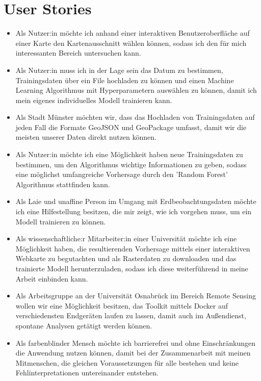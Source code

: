 \documentclass[a4paper,12pt]{article}
\begin{document}
\section{User Stories}
\begin{itemize}
\item Als Nutzer:in möchte ich anhand einer interaktiven Benutzeroberfläche auf einer Karte den Kartenausschnitt wählen können, sodass ich den für mich interessanten Bereich untersuchen kann.
\item Als Nutzer:in muss ich in der Lage sein das Datum zu bestimmen, Trainingsdaten über ein File hochladen zu können und einen Machine Learning Algorithmus mit Hyperparametern auswählen zu können, damit ich mein eigenes individuelles Modell trainieren kann.
\item Als Stadt Münster möchten wir, dass das Hochladen von Trainingsdaten auf jeden Fall die Formate GeoJSON und GeoPackage umfasst, damit wir die meisten unserer Daten direkt nutzen können. 
\item Als Nutzer:in möchte ich eine Möglichkeit haben neue Trainingsdaten zu bestimmen, um den Algorithmus wichtige Informationen zu geben, sodass eine möglichst umfangreiche Vorhersage durch den 'Random Forest' Algorithmus stattfinden kann.
\item Als Laie und unaffine Person im Umgang mit Erdbeobachtungsdaten möchte ich eine Hilfestellung besitzen, die mir zeigt, wie ich vorgehen muss, um ein Modell trainieren zu können.
\item Als wissenschaftliche:r Mitarbeiter:in einer Universität möchte ich eine Möglichkeit haben, die resultierenden Vorhersage  mittels einer interaktiven Webkarte zu begutachten und als Rasterdaten zu downloaden und das trainierte Modell herunterzuladen, sodass ich diese weiterführend in meine Arbeit einbinden kann.
\item Als Arbeitsgruppe an der Universität Osnabrück im Bereich Remote Sensing wollen wir eine Möglichkeit besitzen, das Toolkit mittels Docker auf verschiedensten Endgeräten laufen zu lassen, damit auch im Außendienst, spontane Analysen getätigt werden können.
\item Als farbenblinder Mensch möchte ich barrierefrei und ohne Einschränkungen die Anwendung nutzen können, damit bei der Zusammenarbeit mit meinen Mitmenschen, die gleichen Voraussetzungen für alle bestehen und keine Fehlinterpretationen untereinander entstehen.

\end{itemize}
\end{document}
